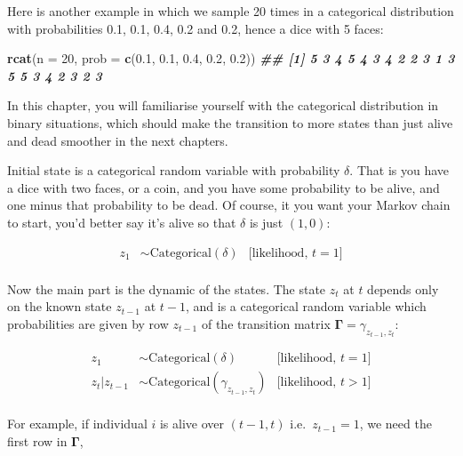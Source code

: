\documentclass[
  12pt,
]{krantz}
\newenvironment{Shaded}{\begin{snugshade}}{\end{snugshade}}
\newcommand{\AttributeTok}[1]{\textcolor[rgb]{0.13,0.29,0.53}{#1}}
\newcommand{\DecValTok}[1]{\textcolor[rgb]{0.00,0.00,0.81}{#1}}
\newcommand{\DocumentationTok}[1]{\textcolor[rgb]{0.56,0.35,0.01}{\textbf{\textit{#1}}}}
\newcommand{\FloatTok}[1]{\textcolor[rgb]{0.00,0.00,0.81}{#1}}
\newcommand{\FunctionTok}[1]{\textcolor[rgb]{0.13,0.29,0.53}{\textbf{#1}}}
\newcommand{\NormalTok}[1]{#1}
\begin{document}
Here is another example in which we sample 20 times in a categorical distribution with probabilities 0.1, 0.1, 0.4, 0.2 and 0.2, hence a dice with 5 faces:

\begin{Shaded}
\begin{Highlighting}[]
\FunctionTok{rcat}\NormalTok{(}\AttributeTok{n =} \DecValTok{20}\NormalTok{, }\AttributeTok{prob =} \FunctionTok{c}\NormalTok{(}\FloatTok{0.1}\NormalTok{, }\FloatTok{0.1}\NormalTok{, }\FloatTok{0.4}\NormalTok{, }\FloatTok{0.2}\NormalTok{, }\FloatTok{0.2}\NormalTok{))}
\DocumentationTok{\#\#  [1] 5 3 4 5 4 3 4 2 2 3 1 3 5 5 3 4 2 3 2 3}
\end{Highlighting}
\end{Shaded}

In this chapter, you will familiarise yourself with the categorical distribution in binary situations, which should make the transition to more states than just alive and dead smoother in the next chapters.

Initial state is a categorical random variable with probability \(\delta\). That is you have a dice with two faces, or a coin, and you have some probability to be alive, and one minus that probability to be dead. Of course, it you want your Markov chain to start, you'd better say it's alive so that \(\delta\) is just \((1,0)\):

\begin{align*}
   z_1 &\sim \text{Categorical}(\delta) &\text{[likelihood, }t = 1 \text{]}\\
\end{align*}

Now the main part is the dynamic of the states. The state \(z_t\) at \(t\) depends only on the known state \(z_{t-1}\) at \(t-1\), and is a categorical random variable which probabilities are given by row \(z_{t-1}\) of the transition matrix \(\mathbf{\Gamma} = \gamma_{z_{t-1},z_{t}}\):

\begin{align*}
   z_1 &\sim \text{Categorical}(\delta) &\text{[likelihood, }t = 1 \text{]}\\
   z_t | z_{t-1} &\sim \text{Categorical}(\gamma_{z_{t-1},z_{t}}) &\text{[likelihood, }t > 1 \text{]}\\
\end{align*}

For example, if individual \(i\) is alive over \((t-1,t)\) i.e.~\(z_{t-1} = 1\), we need the first row in \(\mathbf{\Gamma}\),
\end{document}
